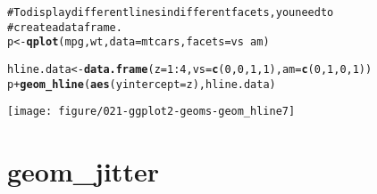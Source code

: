 \documentclass[a4paper,titlepage]{tufte-handout}\usepackage{graphicx, color}
\makeatletter
\def\maxwidth{ %
  \ifdim\Gin@nat@width>\linewidth
    \linewidth
  \else
    \Gin@nat@width
  \fi
}
\newcommand{\hlfunctioncall}[1]{\textcolor[rgb]{0.501960784313725,0,0.329411764705882}{\textbf{#1}}}%
\newcommand{\hlcomment}[1]{\textcolor[rgb]{0.180392156862745,0.6,0.341176470588235}{#1}}%
\newenvironment{kframe}{%
 \def\at@end@of@kframe{}%
 \ifinner\ifhmode%
  \def\at@end@of@kframe{\end{minipage}}%
  \begin{minipage}{\columnwidth}%
 \fi\fi%
 \def\FrameCommand##1{\hskip\@totalleftmargin \hskip-\fboxsep
 \colorbox{shadecolor}{##1}\hskip-\fboxsep
     \hskip-\linewidth \hskip-\@totalleftmargin \hskip\columnwidth}%
 \MakeFramed {\advance\hsize-\width
   \@totalleftmargin\z@ \linewidth\hsize
   \@setminipage}}%
 {\par\unskip\endMakeFramed%
 \at@end@of@kframe}
\newenvironment{knitrout}{}{} %
\makeatother
\begin{document}
\begin{knitrout}
\begin{kframe}
\begin{alltt}
\hlcomment{# To display different lines in different facets, you need to}
\hlcomment{# create a data frame.}
p <- \hlfunctioncall{qplot}(mpg, wt, data=mtcars, facets = vs ~ am)

hline.data <- \hlfunctioncall{data.frame}(z = 1:4, vs = \hlfunctioncall{c}(0,0,1,1), am = \hlfunctioncall{c}(0,1,0,1))
p + \hlfunctioncall{geom_hline}(\hlfunctioncall{aes}(yintercept = z), hline.data)
\end{alltt}
\end{kframe}
\texttt{[image: figure/021-ggplot2-geoms-geom\_hline7]} 
\begin{kframe}\begin{alltt}


\end{alltt}
\end{kframe}
\end{knitrout}



\section{geom\_jitter}
\end{document}
